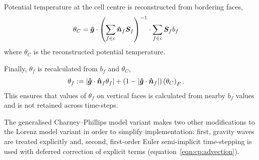 Potential temperature at the cell centre is reconstructed from bordering faces,
\begin{align}
	\theta_C &= \bm{\hat{g}} \cdot \left( \sum_{f \in c} \bm{\hat{n}}_f \bm{S}_f \right)^{-1} \cdot \sum_{f \in c} \bm{S}_f b_f \label{eqn:cp:reconstruct}
\end{align}
where $\theta_C$ is the reconstructed potential temperature.

Finally, $\theta_f$ is recalculated from $b_f$ and $\theta_C$,
\begin{align}
	\theta_f &:= \left\lvert  \bm{\hat{g}} \cdot \bm{\hat{n}}_f \theta_f \right\rvert + \left( 1 - \left\lvert \bm{\hat{g}} \cdot \bm{\hat{n}}_f  \right\rvert \right) \left( \theta_C \right)_F \text{.}
\end{align}
This ensures that values of $\theta_f$ on vertical faces is calculated from nearby $b_f$ values and is not retained across time-steps.

The generalised Charney--Phillips model variant makes two other modifications to the Lorenz model variant in order to simplify implementation: first, gravity waves are treated explicitly and, second, first-order Euler semi-implicit time-stepping is used with deferred correction of explicit terms (equation~\ref{eqn:cp:advection}).

